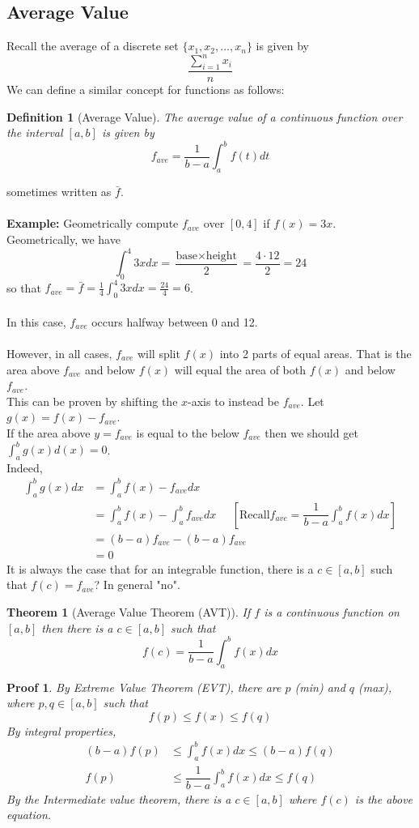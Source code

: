 \documentclass[10pt]{article}
\theoremstyle{break}
\newtheorem{thm}{Theorem}[subsection]
\newtheorem*{pf}{Proof}
\newtheorem{defn}{Definition}[subsection]
\begin{document}
\subsection{Average Value}
Recall the average of a discrete set $\{x_1, x_2, \dots, x_n\}$ is given by $$\dfrac{\sum^n_{i=1}x_i}{n}$$
We can define a similar concept for functions as follows:
\begin{defn}[Average Value]
    The average value of a continuous function over the interval $[a, b]$ is given by $$f_{ave} = \dfrac{1}{b-a}\int^b_a f(t) dt$$
\end{defn}
sometimes written as $\bar{f}$.\\ \; \\
\textbf{Example:}
Geometrically compute $f_{ave}$ over $[0,4]$ if $f(x)=3x$. \\
Geometrically, we have $$\int^4_0 3x dx = \dfrac{\text{base} \times \text{height}}{2} = \dfrac{4 \cdot 12}{2} = 24$$
so that $f_{ave} = \bar{f} = \frac{1}{4} \int^4_0 3x dx = \frac{24}{4} = 6$.\\ \; \\
In this case, $f_{ave}$ occurs halfway between 0 and 12. \\ \: \\
However, in all cases, $f_{ave}$ will split $f(x)$ into 2 parts of equal areas.
That is the area above $f_{ave}$ and below $f(x)$ will equal the area of both $f(x)$ and below $f_{ave}$. \\ 
This can be proven by shifting the $x$-axis to instead be $f_{ave}$. Let $g(x) = f(x) - f_{ave}$.\\
If the area above $y = f_{ave}$ is equal to the below $f_{ave}$ then we should get $\int^b_a g(x)d(x) = 0$. \\
Indeed, 
\begin{align*}
    \int^b_a g(x) dx &= \int^b_a f(x) - f_{ave} dx\\
    &= \int^b_a f(x) - \int^b_a f_{ave}dx \; \; \; \; \; [\text{Recall} f_{ave} = \dfrac{1}{b-a} \int^b_a f(x) dx]\\
    &= (b-a)f_{ave} - (b-a)f_{ave}\\
    &= 0
\end{align*}
It is always the case that for an integrable function, there is a $c \in [a,b]$ such that $f(c) = f_{ave}$? In general "no".\\
\begin{thm}[Average Value Theorem (AVT)]
    If $f$ is a continuous function on $[a,b]$ then there is a $c \in [a,b]$ such that $$f(c) = \frac{1}{b-a} \int^b_a f(x) dx$$
\end{thm}
\begin{pf}
    By Extreme Value Theorem (EVT), there are $p$ (min) and $q$ (max), where $p, q \in [a,b]$ such that $$f(p) \le f(x) \le f(q)$$
    By integral properties, 
    \begin{align*}
        (b-a) f(p) &\le \int^b_a f(x) dx \le (b-a)f(q)\\
        f(p) &\le \dfrac{1}{b-a} \int^b_a f(x) dx \le f(q)
    \end{align*}
    By the Intermediate value theorem, there is a $c \in [a, b]$ where $f(c)$ is the above equation.
\end{pf}
\end{document}
